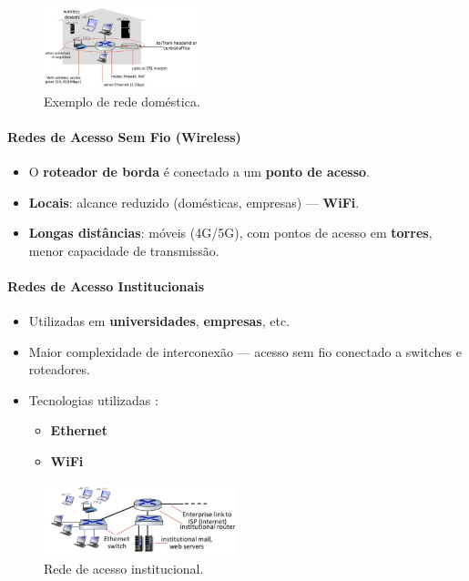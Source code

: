     \begin{figure}[H]
        \centering
        \includegraphics[width=0.4\textwidth]{img/cap-01/rede-domestica.png}
        \caption{Exemplo de rede doméstica.}
    \end{figure}

    \paragraph{Redes de Acesso Sem Fio (Wireless)}
    \begin{itemize}[left=0.5cm, align=left, nosep]
        \item O \textbf{roteador de borda} é conectado a um \textbf{ponto de acesso}.
        \item \textbf{Locais}: alcance reduzido (domésticas, empresas) — \textbf{WiFi}.
        \item \textbf{Longas distâncias}: móveis (4G/5G), com pontos de acesso em \textbf{torres}, menor capacidade de transmissão.
    \end{itemize}

    \paragraph{Redes de Acesso Institucionais}
    \begin{itemize}[left=0.5cm, align=left, nosep]
        \item Utilizadas em \textbf{universidades}, \textbf{empresas}, etc.
        \item Maior complexidade de interconexão — acesso sem fio conectado a switches e roteadores.
        
        \item Tecnologias utilizadas :
        \begin{itemize}[left=0.5cm, nosep, label=$\hookrightarrow$]
            \item \textbf{Ethernet} 
            \item \textbf{WiFi}
        \end{itemize} 
    
    \end{itemize}

    \begin{figure}[H]
        \centering
        \includegraphics[width=0.5\textwidth]{img/cap-01/rede-institucional.png}
        \caption{Rede de acesso institucional.}
    \end{figure}

